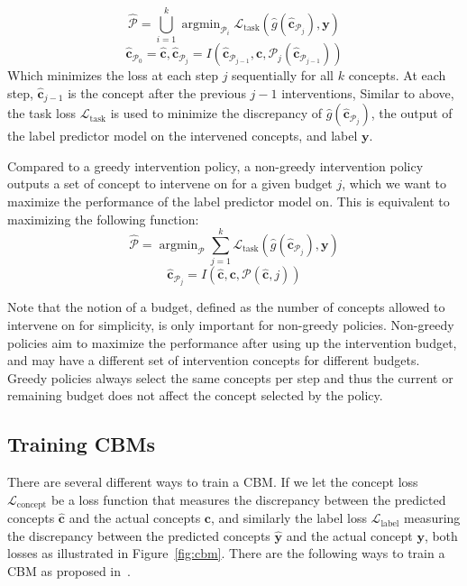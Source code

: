 \documentclass[../main.tex]{subfiles}
\begin{document}
\[\hat{\mathcal{P}} = \bigcup_{i=1}^k \mathop{\mathrm{argmin}}_{\mathcal{P}_i} \mathcal{L}_{\text{task}}(\hat{g}(\hat{\mathbf{c}}_{\mathcal{P}_j}), \mathbf{y}) \]
\[\hat{\mathbf{c}}_{\mathcal{P}_0} = \hat{\mathbf{c}}, \hat{\mathbf{c}}_{\mathcal{P}_j} = I(\hat{\mathbf{c}}_{\mathcal{P}_{j-1}}, \mathbf{c}, \mathcal{P}_j(\hat{\mathbf{c}}_{\mathcal{P}_{j-1}}))\]
Which minimizes the loss at each step $j$ sequentially
for all $k$ concepts. At each
step, $\hat{\mathbf{c}}_{j-1}$ is 
the concept after the previous $j-1$ interventions,
Similar to above, the task loss $\mathcal{L}_{\text{task}}$ is used to minimize
the discrepancy of $\hat{g}(\hat{\mathbf{c}}_{\mathcal{P}_j})$, 
the output of the label predictor model on the intervened concepts,
and label $\mathbf{y}$.

Compared to a greedy intervention policy, a non-greedy intervention 
policy outputs a set of concept to intervene on for a given budget $j$,
which we want to maximize the performance of the 
label predictor model on. This is equivalent to maximizing the following 
function:
\[\hat{\mathcal{P}} = \mathop{\mathrm{argmin}}_{\mathcal{P}} \sum_{j=1}^k \mathcal{L}_{\text{task}}(\hat{g}(\hat{\mathbf{c}}_{\mathcal{P}_j}), \mathbf{y}) \]
\[\hat{\mathbf{c}}_{\mathcal{P}_j} = I(\hat{\mathbf{c}}, \mathbf{c}, \mathcal{P}(\hat{\mathbf{c}}, j))\]

Note that the notion of a budget, defined as the number
of concepts allowed to intervene on for simplicity, is only
important for non-greedy policies. Non-greedy policies aim
to maximize the performance after using up the intervention budget,
and may have a different set of intervention concepts 
for different budgets. Greedy policies always select the same
concepts per step and thus the current or remaining budget does not 
affect the concept selected by the policy.

\subsection{Training CBMs}

There are several different ways to train a CBM. 
If we let the concept loss $\mathcal{L}_{\text{concept}}$ be a loss
 function that measures
the discrepancy between the predicted concepts $\hat{\mathbf{c}}$
and the actual concepts $\mathbf{c}$, and similarly the 
label loss $\mathcal{L}_{\text{label}}$ measuring the discrepancy
between the predicted concepts $\hat{\mathbf{y}}$
and the actual concept $\mathbf{y}$,
both losses as illustrated in Figure~\ref{fig:cbm}.
There are the following ways
to train a CBM as proposed in~\cite{cbm}.
\end{document}
